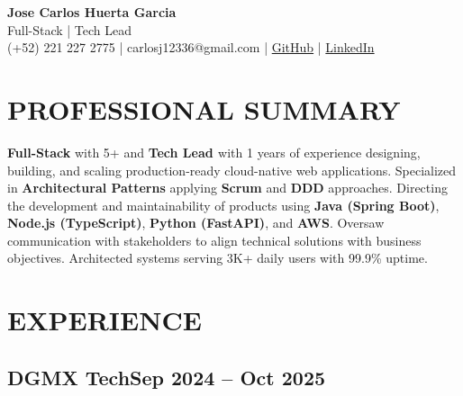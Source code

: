 \documentclass[a4paper,10pt]{article}
\newcommand{\kw}[1]{\textbf{\textcolor{keyword}{#1}}}
\begin{document}
\begin{center}
{\bfseries\LARGE Jose Carlos Huerta Garcia} \\
Full-Stack | Tech Lead \\
(+52) 221 227 2775 | carlosj12336@gmail.com | \href{https://github.com/jcarloshg}{GitHub} | \href{https://www.linkedin.com/in/jose-carlos-huerta-garcia-773952212}{LinkedIn}
\end{center}

\section*{PROFESSIONAL SUMMARY}
\kw{Full-Stack} with 5+ and \kw{Tech Lead } with 1 years of experience designing, building, and scaling production-ready cloud-native web applications. Specialized in \kw{Architectural Patterns} applying \kw{Scrum} and \kw{DDD} approaches. Directing the development and maintainability of products using \kw{Java (Spring Boot)}, \kw{Node.js (TypeScript)}, \kw{Python (FastAPI)}, and \kw{AWS}. Oversaw communication with stakeholders to align technical solutions with business objectives. Architected systems serving 3K+ daily users with 99.9\% uptime.

\section*{EXPERIENCE}

\subsection*{\small DGMX Tech\hfill\textbf{Sep 2024 -- Oct 2025}}
\end{document}
